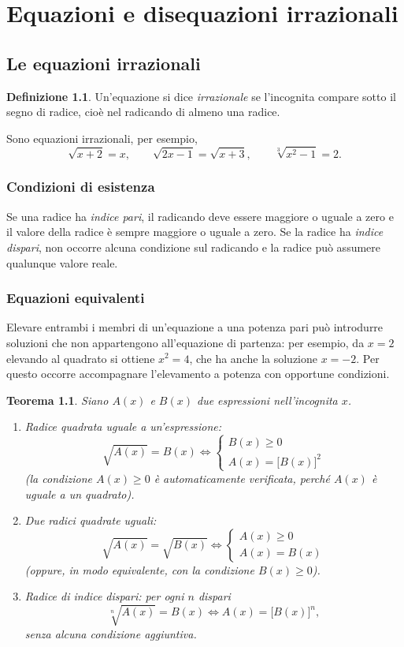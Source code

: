\documentclass[12pt,a4paper,openany]{book}
\theoremstyle{definition}
\newtheorem{definizione}{Definizione}[section]
\theoremstyle{plain}
\newtheorem{teorema}{Teorema}[section]
\theoremstyle{remark}
\newcommand{\sistema}[1]{\begin{cases}#1\end{cases}}
\begin{document}
\chapter{Equazioni e disequazioni irrazionali}

\section{Le equazioni irrazionali}

\begin{definizione}
Un'equazione si dice \emph{irrazionale} se l'incognita compare sotto il segno di radice, cioè nel radicando di almeno una radice.
\end{definizione}

Sono equazioni irrazionali, per esempio,
\[
\sqrt{x+2}=x,\qquad \sqrt{2x-1}=\sqrt{x+3},\qquad \sqrt[3]{x^2-1}=2.
\]

\subsection*{Condizioni di esistenza}

Se una radice ha \emph{indice pari}, il radicando deve essere maggiore o uguale a zero e il valore della radice è sempre maggiore o uguale a zero. Se la radice ha \emph{indice dispari}, non occorre alcuna condizione sul radicando e la radice può assumere qualunque valore reale.

\subsection*{Equazioni equivalenti}

Elevare entrambi i membri di un'equazione a una potenza pari può introdurre soluzioni che non appartengono all'equazione di partenza: per esempio, da $x=2$ elevando al quadrato si ottiene $x^2=4$, che ha anche la soluzione $x=-2$. Per questo occorre accompagnare l'elevamento a potenza con opportune condizioni.

\begin{teorema}
Siano $A(x)$ e $B(x)$ due espressioni nell'incognita $x$.
\begin{enumerate}[label=\arabic*)]
\item \emph{Radice quadrata uguale a un'espressione:}
\[
\sqrt{A(x)}=B(x)\iff \sistema{B(x)\ge 0\\ A(x)=\bigl[B(x)\bigr]^2}
\]
(la condizione $A(x)\ge 0$ è automaticamente verificata, perché $A(x)$ è uguale a un quadrato).
\item \emph{Due radici quadrate uguali:}
\[
\sqrt{A(x)}=\sqrt{B(x)}\iff \sistema{A(x)\ge 0\\ A(x)=B(x)}
\]
(oppure, in modo equivalente, con la condizione $B(x)\ge 0$).
\item \emph{Radice di indice dispari:} per ogni $n$ dispari
\[
\sqrt[n]{A(x)}=B(x)\iff A(x)=\bigl[B(x)\bigr]^n,
\]
senza alcuna condizione aggiuntiva.
\end{enumerate}
\end{teorema}
\end{document}
